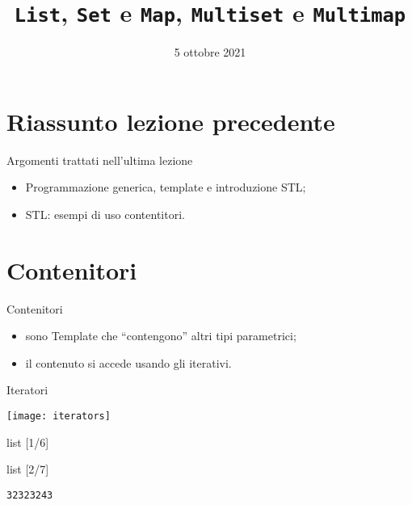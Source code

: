 \documentclass[xcolor={dvipsnames, svgnames, x11names, table}, 10pt]{beamer}
\title{\texttt{List}, \texttt{Set} e \texttt{Map}, \texttt{Multiset} e \texttt{Multimap}}
\date{5 ottobre 2021}
\institute{Università degli Studi di Trento}
\begin{document}
\frame{\titlepage}

\section*{Riassunto lezione precedente}

\begin{frame}{Argomenti trattati nell'ultima lezione}

    \begin{itemize}
        \item Programmazione generica, template e introduzione STL;
        \item STL: esempi di uso contentitori.
    \end{itemize}

\end{frame}

\section{Contenitori}

\begin{frame}{Contenitori}

    \begin{itemize}
        \item sono Template che \enquote{contengono} altri tipi parametrici;
        \item il contenuto si accede usando gli iterativi.
    \end{itemize}

\end{frame}

\begin{frame}[c]{Iteratori}

    \texttt{[image: iterators]}

\end{frame}

\begin{frame}[t, fragile]{list [1/6]}


\end{frame}

\begin{frame}[t, fragile]{list [2/7]}

    
    \begin{center}
        \texttt{32323243}
    \end{center}

\end{frame}
\end{document}
